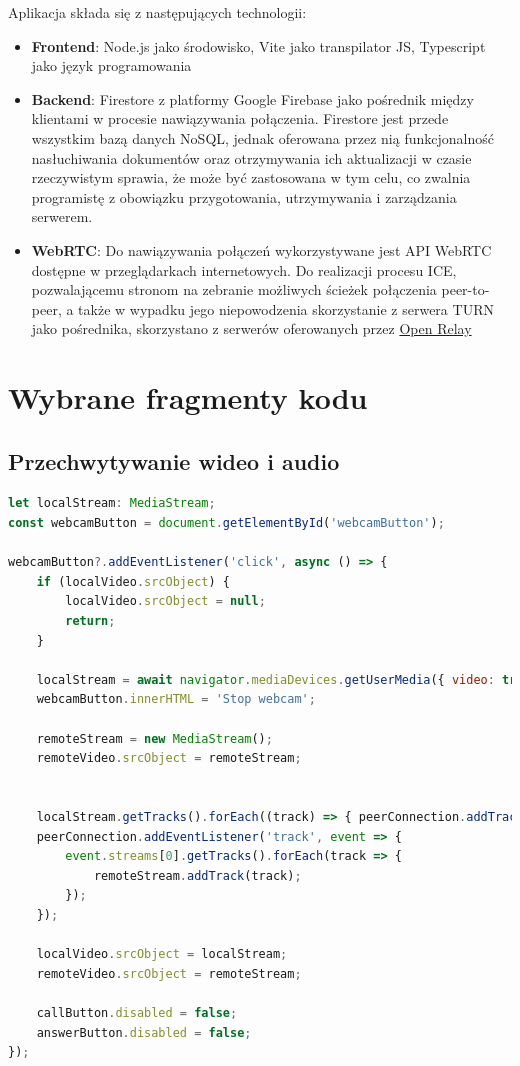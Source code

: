 Aplikacja składa się z następujących technologii:

\begin{itemize}
  \item \textbf{Frontend}: Node.js jako środowisko, Vite jako transpilator JS, Typescript jako język programowania
  \item \textbf{Backend}: Firestore z platformy Google Firebase jako pośrednik między klientami w procesie nawiązywania
        połączenia. Firestore jest przede wszystkim bazą danych NoSQL, jednak oferowana przez nią funkcjonalność
        nasłuchiwania dokumentów oraz otrzymywania ich aktualizacji w czasie rzeczywistym sprawia, że może być
        zastosowana w tym celu, co zwalnia programistę z obowiązku przygotowania, utrzymywania i zarządzania serwerem.
  \item \textbf{WebRTC}: Do nawiązywania połączeń wykorzystywane jest API WebRTC dostępne w przeglądarkach
        internetowych. Do realizacji procesu ICE, pozwalającemu stronom na zebranie możliwych ścieżek połączenia
        peer-to-peer, a także w wypadku jego niepowodzenia skorzystanie z serwera TURN jako pośrednika, skorzystano z
        serwerów oferowanych przez \href{https://www.metered.ca/tools/openrelay/}{Open Relay}
\end{itemize}

\section{Wybrane fragmenty kodu}
\subsection{Przechwytywanie wideo i audio}

\begin{lstlisting}[language=Javascript,label=list:media-capture, caption=Przechwytywanie wideo i audio z komputera,
basicstyle=\footnotesize \ttfamily, showtabs=true, tabsize=4]
let localStream: MediaStream;
const webcamButton = document.getElementById('webcamButton');

webcamButton?.addEventListener('click', async () => {
	if (localVideo.srcObject) {
		localVideo.srcObject = null;
		return;
	}

	localStream = await navigator.mediaDevices.getUserMedia({ video: true, audio: true, });
	webcamButton.innerHTML = 'Stop webcam';

	remoteStream = new MediaStream();
	remoteVideo.srcObject = remoteStream;


	localStream.getTracks().forEach((track) => { peerConnection.addTrack(track, localStream); });
	peerConnection.addEventListener('track', event => {
		event.streams[0].getTracks().forEach(track => {
			remoteStream.addTrack(track);
		});
	});

	localVideo.srcObject = localStream;
	remoteVideo.srcObject = remoteStream;

	callButton.disabled = false;
	answerButton.disabled = false;
});

\end{lstlisting}

